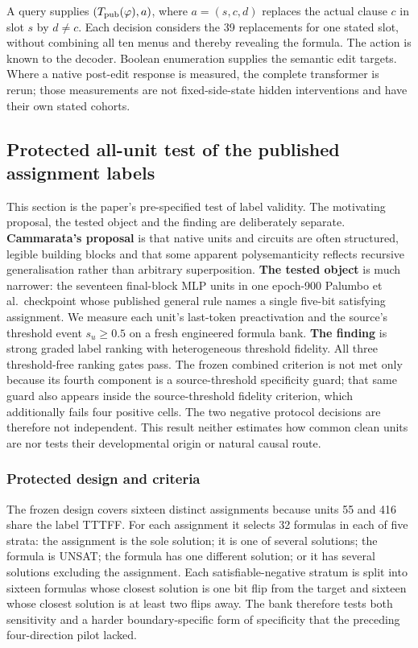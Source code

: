 \documentclass[
  british,
  11pt,
  a4paper,
]{article}
\begin{document}
A query supplies \((T_{\rm pub}(\varphi),a)\), where \(a=(s,c,d)\)
replaces the actual clause \(c\) in slot \(s\) by \(d\ne c\). Each
decision considers the 39 replacements for one stated slot, without
combining all ten menus and thereby revealing the formula. The action is
known to the decoder. Boolean enumeration supplies the semantic edit
targets. Where a native post-edit response is measured, the complete
transformer is rerun; those measurements are not fixed-side-state hidden
interventions and have their own stated cohorts.

\subsection{Protected all-unit test of the published assignment
labels}\label{protected-all-unit-test-of-the-published-assignment-labels}

This section is the paper's pre-specified test of label validity. The
motivating proposal, the tested object and the finding are deliberately
separate. \textbf{Cammarata's proposal} is that native units and
circuits are often structured, legible building blocks and that some
apparent polysemanticity reflects recursive generalisation rather than
arbitrary superposition. \textbf{The tested object} is much narrower:
the seventeen final-block MLP units in one epoch-900 Palumbo et
al.~checkpoint whose published general rule names a single five-bit
satisfying assignment. We measure each unit's last-token preactivation
and the source's threshold event \(s_u\ge0.5\) on a fresh engineered
formula bank. \textbf{The finding} is strong graded label ranking with
heterogeneous threshold fidelity. All three threshold-free ranking gates
pass. The frozen combined criterion is not met only because its fourth
component is a source-threshold specificity guard; that same guard also
appears inside the source-threshold fidelity criterion, which
additionally fails four positive cells. The two negative protocol
decisions are therefore not independent. This result neither estimates
how common clean units are nor tests their developmental origin or
natural causal route.

\subsubsection{Protected design and
criteria}\label{protected-design-and-criteria}

The frozen design covers sixteen distinct assignments because units 55
and 416 share the label TTTFF. For each assignment it selects 32
formulas in each of five strata: the assignment is the sole solution; it
is one of several solutions; the formula is UNSAT; the formula has one
different solution; or it has several solutions excluding the
assignment. Each satisfiable-negative stratum is split into sixteen
formulas whose closest solution is one bit flip from the target and
sixteen whose closest solution is at least two flips away. The bank
therefore tests both sensitivity and a harder boundary-specific form of
specificity that the preceding four-direction pilot lacked.
\end{document}
